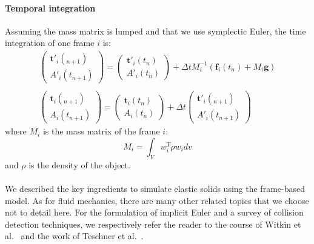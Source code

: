 \paragraph{Temporal integration}
Assuming the mass matrix is lumped and that we use symplectic Euler, the time integration of one frame $i$ is:
\begin{equation}
\displaystyle
\begin{array}{l}
\begin{pmatrix}
\mathbf{t'}_{i}(_{n+1}) \\
A'_{i}(t_{n+1})
\end{pmatrix} 
=
\begin{pmatrix}
\mathbf{t'}_{i}(t_{n}) \\
A'_{i}(t_{n})
\end{pmatrix} 
+
\Delta t
M_{i}^{-1}
\left(\mathbf{f}_{i}(t_{n}) + M_{i}\mathbf{g} \right)
\\ \\
\begin{pmatrix}
\mathbf{t}_{i}(_{n+1}) \\
A_{i}(t_{n+1})
\end{pmatrix} 
=
\begin{pmatrix}
\mathbf{t}_{i}(t_{n}) \\
A_{i}(t_{n})
\end{pmatrix} 
+
\Delta t
\begin{pmatrix}
\mathbf{t'}_{i}(_{n+1}) \\ A'_{i}(t_{n+1})
\end{pmatrix} 
\end{array}
\end{equation}
where $M_{i}$ is the mass matrix of the frame $i$:
\begin{equation}
\label{eq:massMatrix}
M_{i} = \int_{V} w_{i}^{T} \rho w_{i} dv
\end{equation}
and $\rho$ is the density of the object.
\paragraph*{}
We described the key ingredients to simulate elastic solids using the frame-based model.
As for fluid mechanics, there are many other related topics that we choose not to detail here.
For the formulation of implicit Euler and a survey of collision detection techniques, we respectively refer the reader to the course of Witkin et al.~\cite{Witkin2001} and the work of Teschner et al.~\cite{Teschner2005}.

